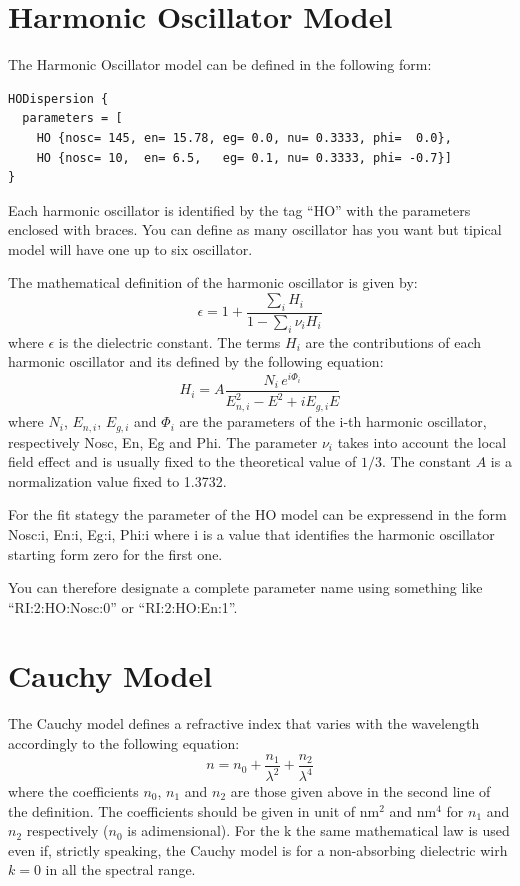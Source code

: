 \documentclass[a4paper]{report}
\begin{document}
\section{Harmonic Oscillator Model}
The Harmonic Oscillator model can be defined in the following form:
\begin{verbatim}
HODispersion {
  parameters = [
    HO {nosc= 145, en= 15.78, eg= 0.0, nu= 0.3333, phi=  0.0},
    HO {nosc= 10,  en= 6.5,   eg= 0.1, nu= 0.3333, phi= -0.7}]
}
\end{verbatim}
Each harmonic oscillator is identified by the tag ``HO'' with the parameters enclosed with braces.
You can define as many oscillator has you want but tipical model will have one up to six oscillator.

The mathematical definition of the harmonic oscillator is given by:
\begin{equation}
  \epsilon = 1 + \frac{\sum_i H_i}{1 - \sum_i \nu_i H_i}
\end{equation}
where $\epsilon$ is the dielectric constant.
The terms $H_i$ are the contributions of each harmonic oscillator and its defined by the following equation:
\begin{equation}
  H_i = A \frac{N_i \, e^{i \Phi_i}}{E_{n,i}^2 - E^2 + i E_{g,i} E}
\end{equation}
where $N_i$, $E_{n,i}$, $E_{g,i}$ and $\Phi_i$ are the parameters of the i-th harmonic oscillator, respectively Nosc, En, Eg and Phi.
The parameter $\nu_i$ takes into account the local field effect and is usually fixed to the theoretical value of $1/3$.
The constant $A$ is a normalization value fixed to 1.3732.

For the fit stategy the parameter of the HO model can be expressend in the form Nosc:i, En:i, Eg:i, Phi:i where i is a value that identifies the harmonic oscillator starting form zero for the first one.

You can therefore designate a complete parameter name using something like ``RI:2:HO:Nosc:0'' or ``RI:2:HO:En:1''.

\section{Cauchy Model}

The Cauchy model defines a refractive index that varies with the wavelength accordingly to the following equation:
\begin{equation}
  n = n_0 + \frac{n_1}{\lambda^2} + \frac{n_2}{\lambda^4}
\end{equation}
where the coefficients $n_0$, $n_1$ and $n_2$ are those given above in the second line of the definition.
The coefficients should be given in unit of $\textrm{nm}^2$ and $\textrm{nm}^4$ for $n_1$ and $n_2$ respectively ($n_0$ is adimensional).
For the k the same mathematical law is used even if, strictly speaking, the Cauchy model is for a non-absorbing dielectric wirh $k = 0$ in all the spectral range.
\end{document}
